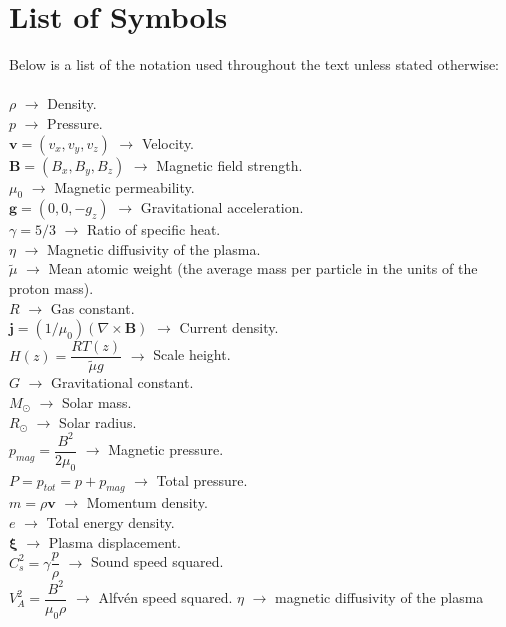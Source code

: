 \documentclass[12pt,a4paper,twoside]{article}
\newcommand{\Alfven}{Alfv\'{e}n }
\begin{document}
\section*{List of Symbols}
Below is a list of the notation used throughout the text unless stated otherwise: \\ \\
$\rho$ $\rightarrow$ Density.  \\
$p$ $\rightarrow$ Pressure. \\
$\boldsymbol{v} = (v_x, v_y, v_z)$ $\rightarrow$ Velocity.  \\
$\boldsymbol{B} = (B_x,B_y,B_z)$ $\rightarrow$ Magnetic field strength. \\
$\mu_0$ $\rightarrow$ Magnetic permeability. \\
$\boldsymbol{g} = (0,0,-g_z)$ $\rightarrow$ Gravitational acceleration. \\
$\gamma = 5/3$ $\rightarrow$ Ratio of specific heat. \\
$\eta$ $\rightarrow$ Magnetic diffusivity of the plasma. \\
$\widetilde{\mu}$ $\rightarrow$ Mean atomic weight (the average mass per particle in the units of the proton mass).  \\
$R$ $\rightarrow$ Gas constant.\\
$\boldsymbol{j} = (1 / \mu_0) (\nabla \times \boldsymbol{B})$ $\rightarrow$ Current density.  \\
$H(z) = \dfrac{R T(z)}{\widetilde{\mu} g}$ $\rightarrow$ Scale height.  \\
$G$ $\rightarrow$ Gravitational constant. \\
$M_{\odot}$ $\rightarrow$ Solar mass. \\
$R_{\odot}$ $\rightarrow$ Solar radius. \\
$p_{mag} = \dfrac{B^2}{2 \mu_0} $ $\rightarrow$ Magnetic pressure. \\
$P=p_{tot} = p + p_{mag} $ $\rightarrow$ Total pressure. \\
$m = \rho \boldsymbol{v}$ $\rightarrow$ Momentum density. \\
$e$ $\rightarrow$ Total energy density. \\ 
$\boldsymbol{\xi}$ $\rightarrow$ Plasma displacement. \\
$C^2_s = \gamma \dfrac{p}{\rho}$ $\rightarrow$ Sound speed squared. \\ 
$V_A^2=\dfrac{B^2}{\mu_0 \rho}$ $\rightarrow$ \Alfven speed squared. 
$\eta$ $\rightarrow$ magnetic diffusivity of the plasma
\clearpage
\setcounter{page}{1}
\end{document}
